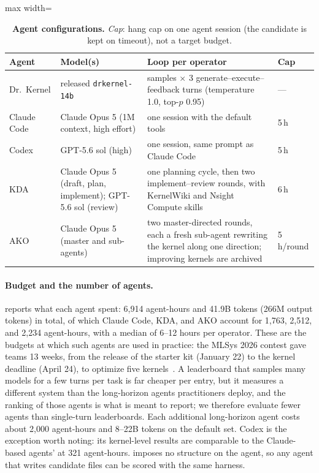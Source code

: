 \begin{table}[t]
  \centering
  \caption{\textbf{Agent configurations.} \emph{Cap}: hang cap on one agent session (the candidate is kept on timeout), not a target budget.}
  \label{fastkernels:tab:agent-config}
  \scriptsize
  \setlength{\tabcolsep}{3pt}
  \begin{adjustbox}{max width=\linewidth}
  \begin{tabular}{@{}l>{\raggedright\arraybackslash}p{3.4cm}>{\raggedright\arraybackslash}p{6.2cm}l@{}}
  \toprule
  \textbf{Agent} & \textbf{Model(s)} & \textbf{Loop per operator} & \textbf{Cap} \\
  \midrule
  Dr.~Kernel & released \texttt{drkernel-14b} & 8 samples $\times$ 3 generate--execute--feedback turns (temperature 1.0, top-$p$ 0.95) & --- \\
  Claude Code & Claude Opus 5 (1M context, high effort) & one session with the default tools & 5\,h \\
  Codex & GPT-5.6 sol (high) & one session, same prompt as Claude Code & 5\,h \\
  KDA & Claude Opus 5 (draft, plan, implement); GPT-5.6 sol (review) & one planning cycle, then two implement--review rounds, with KernelWiki and Nsight Compute skills & 6\,h \\
  AKO & Claude Opus 5 (master and sub-agents) & two master-directed rounds, each a fresh sub-agent rewriting the kernel along one direction; improving kernels are archived & 5\,h/round \\
  \bottomrule
  \end{tabular}
  \end{adjustbox}
\end{table}

\paragraph{Budget and the number of agents.}
 reports what each agent spent: 6{,}914 agent-hours and 41.9B tokens (266M output tokens) in total, of which Claude Code, KDA, and AKO account for 1{,}763, 2{,}512, and 2{,}234 agent-hours, with a median of 6--12 hours per operator.
These are the budgets at which such agents are used in practice: the MLSys 2026 contest gave teams 13 weeks, from the release of the starter kit (January 22) to the kernel deadline (April 24), to optimize five kernels~\citep{mlsys26contest}.
A leaderboard that samples many models for a few turns per task is far cheaper per entry, but it measures a different system than the long-horizon agents practitioners deploy, and the ranking of those agents is what \FastKernels is meant to report; we therefore evaluate fewer agents than single-turn leaderboards.
Each additional long-horizon agent costs about 2{,}000 agent-hours and 8--22B tokens on the default set.
Codex is the exception worth noting: its kernel-level results are comparable to the Claude-based agents' at 321 agent-hours.
\FastKernels imposes no structure on the agent, so any agent that writes candidate files can be scored with the same harness.

